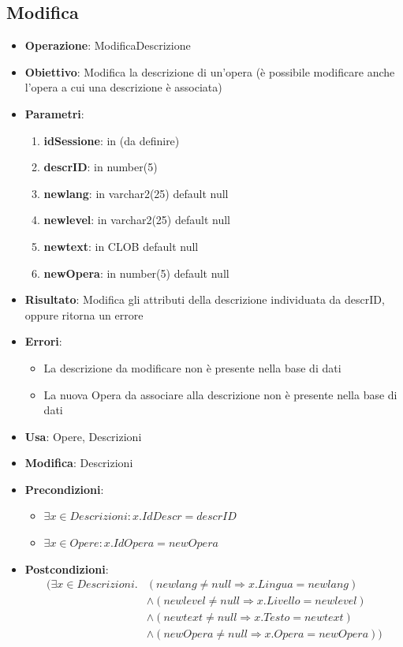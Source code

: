 \documentclass[a4paper,11pt]{article}
\begin{document}
\subsection{Modifica}
\begin{itemize}
	\item \textbf{Operazione}: ModificaDescrizione
	\item \textbf{Obiettivo}: Modifica la descrizione di un'opera (è possibile modificare anche l'opera a cui una descrizione è associata)
	\item \textbf{Parametri}:
	\begin{enumerate}
		\item \textbf{idSessione}: in (da definire)
		\item \textbf{descrID}: in number(5)
		\item \textbf{newlang}: in varchar2(25) default null
		\item \textbf{newlevel}: in varchar2(25) default null
		\item \textbf{newtext}: in CLOB default null
		\item \textbf{newOpera}: in number(5) default null
	\end{enumerate}
	\item \textbf{Risultato}: Modifica gli attributi della descrizione individuata da descrID, oppure ritorna un errore
	\item \textbf{Errori}: 
	\begin{itemize}
		\item La descrizione da modificare non è presente nella base di dati
		\item La nuova Opera da associare alla descrizione non è presente nella base di dati
	\end{itemize}
	\item \textbf{Usa}: Opere, Descrizioni
	\item \textbf{Modifica}: Descrizioni
	\item \textbf{Precondizioni}:
	\begin{itemize}
		\item $\exists x \in Descrizioni : x.IdDescr = descrID$
		\item $\exists x \in Opere : x.IdOpera = newOpera$
	\end{itemize}
	\item \textbf{Postcondizioni}:
		\begin{align*} (\exists x \in Descrizioni.
		& (newlang \ne null \Rightarrow x.Lingua = newlang) \\
		& \land (newlevel \ne null \Rightarrow x.Livello = newlevel) \\
		& \land (newtext \ne null \Rightarrow x.Testo = newtext) \\
		& \land (newOpera \ne null \Rightarrow x.Opera = newOpera))
		\end{align*}
\end{itemize}
\end{document}
